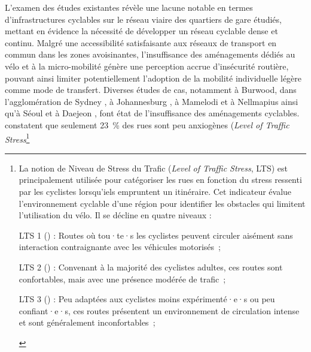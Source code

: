\begin{refsegment}
L'examen des études existantes révèle une lacune notable en termes d'infrastructures cyclables sur le réseau viaire des quartiers de gare étudiés, mettant en évidence la nécessité de développer un réseau cyclable dense et continu. Malgré une accessibilité satisfaisante aux réseaux de transport en commun dans les zones avoisinantes, l'insuffisance des aménagements dédiés au vélo et à la micro-mobilité génère une \gls{perception} accrue d'insécurité routière, pouvant ainsi limiter potentiellement l'adoption de la mobilité individuelle légère comme mode de transfert. Diverses études de cas, notamment à Burwood, dans l'agglomération de Sydney \textcolor{blue}{\autocite[12]{zhang_make_2023}}, à Johannesburg \textcolor{blue}{\autocite[14]{risimati_spatial_2021}}, à Mamelodi et à Nellmapius \textcolor{blue}{\autocite[39]{bechstein_cycling_2010}} ainsi qu'à Séoul et à Daejeon \textcolor{blue}{\autocite[45]{lee_strategies_2010}}, font état de l'insuffisance des aménagements cyclables. \textcolor{blue}{\textcite[6]{zuo_first-and-last_2020}} constatent que seulement 23~\% des rues sont peu anxiogènes (\textsl{Level of Traffic Stress}\footnote{
    La notion de Niveau de Stress du Trafic (\textsl{Level of Traffic Stress}, LTS) est principalement utilisée pour catégoriser les rues en fonction du stress ressenti par les cyclistes lorsqu'iels empruntent un \gls{itinéraire}. Cet indicateur évalue l'environnement cyclable d'une région pour identifier les obstacles qui limitent l'utilisation du vélo. Il se décline en quatre niveaux :
    \begin{customitemize}
\item LTS 1 () : Routes où tou·te·s les cyclistes peuvent circuler aisément sans interaction contraignante avec les véhicules motorisés~;
\item LTS 2 () : Convenant à la majorité des cyclistes adultes, ces routes sont confortables, mais avec une présence modérée de trafic~;
\item LTS 3 () : Peu adaptées aux cyclistes moins expérimenté·e·s ou peu confiant·e·s, ces routes présentent un environnement de circulation intense et sont généralement inconfortables~;

\end{customitemize}}
\end{refsegment}
